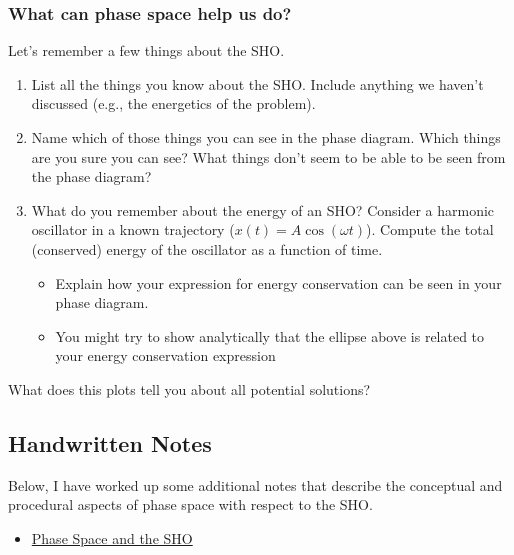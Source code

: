 \subsubsection{What can phase space help us
do?}\label{what-can-phase-space-help-us-do}

Let's remember a few things about the SHO.

\begin{enumerate}
\def\labelenumi{\arabic{enumi}.}
\tightlist
\item
  List all the things you know about the SHO. Include anything we
  haven't discussed (e.g., the energetics of the problem).
\item
  Name which of those things you can see in the phase diagram. Which
  things are you sure you can see? What things don't seem to be able to
  be seen from the phase diagram?
\item
  What do you remember about the energy of an SHO? Consider a harmonic
  oscillator in a known trajectory (\(x(t) = A\cos(\omega t)\)). Compute
  the total (conserved) energy of the oscillator as a function of time.

  \begin{itemize}
  \tightlist
  \item
    Explain how your expression for energy conservation can be seen in
    your phase diagram.
  \item
    You might try to show analytically that the ellipse above is related
    to your energy conservation expression
  \end{itemize}
\end{enumerate}

What does this plots tell you about all potential solutions?

\subsection{Handwritten Notes}\label{handwritten-notes}

Below, I have worked up some additional notes that describe the
conceptual and procedural aspects of phase space with respect to the
SHO.

\begin{itemize}
\tightlist
\item
  \href{../../assets/notes/Notes-Phase_Space.pdf}{Phase Space and the
  SHO}
\end{itemize}
